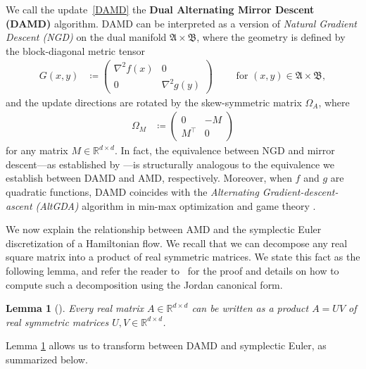 \documentclass[11pt]{article}
\newtheorem{lemma}{Lemma}
\newcommand{\R}{\mathbb{R}}
\newcommand{\frA}{\mathfrak{A}}
\newcommand{\frB}{\mathfrak{B}}
\begin{document}
We call the update~\eqref{DAMD} the \textbf{Dual Alternating Mirror Descent (DAMD)} algorithm. DAMD can be interpreted as a version of \textit{Natural Gradient Descent (NGD)} \cite{Raskutti2015,pmlr-v130-gunasekar21a} on the dual manifold $\frA\times\frB$, where the geometry is defined by the block-diagonal metric tensor
\begin{align*}
    G\left(x,y\right)&\coloneqq 
\begin{pmatrix}
    \nabla^2 f(x) & 0 \\ 
    0 & \nabla^2 g(y)
\end{pmatrix}
\qquad \text{ for }\left(x,y\right)\in\frA\times\frB,
\end{align*}
and the update directions are rotated by the skew-symmetric matrix $\Omega_{A}$, where
\begin{align}
    \Omega_{M}&\coloneqq \begin{pmatrix}
    0 & -M \\ M^\top & 0
\end{pmatrix}\label{OmegaA}
\end{align}
for any matrix $M\in\R^{d\times d}$. In fact, the equivalence between NGD and mirror descent---as established by \cite{Raskutti2015}---is structurally analogous to the equivalence we establish between DAMD and AMD, respectively. Moreover, when $f$ and $g$ are quadratic functions, DAMD coincides with the \textit{Alternating Gradient-descent-ascent (AltGDA)} algorithm in min-max optimization and game theory \citep{9048943,pmlr-v125-bailey20a,pmlr-v151-zhang22e}. 

We now explain the relationship between AMD and the symplectic Euler discretization of a Hamiltonian flow.
We recall that we can decompose any real square matrix into a product of real symmetric matrices. 
We state this fact as the following lemma, and refer the reader to~\citep{Bosch} for the proof and details on how to compute such a decomposition using the Jordan canonical form.

\begin{lemma}[{\citep[Theorem~2]{Bosch}}]\label{decomp}
    Every real matrix $A \in \R^{d \times d}$ can be written as a product $A = UV$ of real symmetric matrices $U,V \in \R^{d \times d}$.
\end{lemma}

Lemma \ref{decomp} allows us to transform between DAMD and symplectic Euler, as summarized below.
\end{document}
